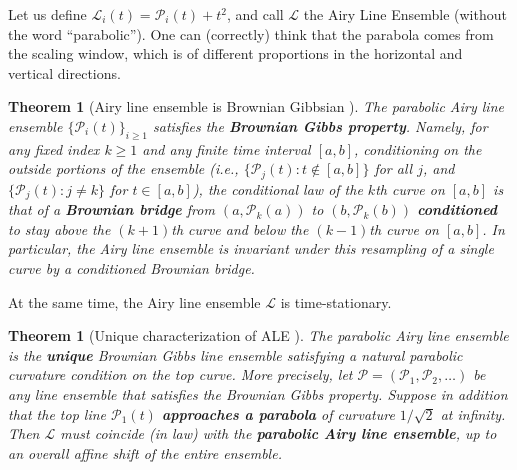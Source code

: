 \documentclass[letterpaper,11pt,oneside,reqno]{book}
\numberwithin{equation}{chapter}  %
\newtheorem{theorem}[proposition]{Theorem}
\theoremstyle{definition}
\begin{document}
Let us define $\mathcal{L}_i(t)=\mathcal{P}_i(t)+t^2$, and call $\mathcal{L}$ the Airy Line Ensemble
(without the word ``parabolic''). One can (correctly) think that the parabola comes
from the scaling window, which is of different proportions in the horizontal and vertical directions.

\begin{theorem}[Airy line ensemble is Brownian Gibbsian \cite{CorwinHammond2013}]
The parabolic Airy line ensemble $\{\mathcal{P}_i(t)\}_{i\ge1}$ satisfies the \textbf{Brownian Gibbs property}. Namely, for any fixed index $k\ge1$ and any finite time interval $[a,b]$, conditioning on the outside portions of the ensemble (i.e., $\{\mathcal{P}_j(t): t\notin[a,b]\}$ for all $j$, and $\{\mathcal{P}_j(t): j\neq k\}$ for $t\in[a,b]$), the conditional law of the $k$th curve on $[a,b]$ is that of a \textbf{Brownian bridge} from $(a,\mathcal{P}_k(a))$ to $(b,\mathcal{P}_k(b))$ \textbf{conditioned} to stay above the $(k+1)$th curve and below the $(k-1)$th curve on $[a,b]$. In particular, the Airy line ensemble is invariant under this resampling of a single curve by a conditioned Brownian bridge.
\end{theorem}

At the same time, the Airy line ensemble $\mathcal{L}$ is time-stationary.

\begin{theorem}[Unique characterization of ALE \cite{AggarwalHuang2023Characterization}]
	The parabolic Airy line ensemble is the \textbf{unique} Brownian Gibbs line ensemble satisfying a natural parabolic curvature condition on the top curve. More precisely, let $\boldsymbol{\mathcal{P}}=(\mathcal{P}_1,\mathcal{P}_2,\ldots)$ be any line ensemble that satisfies the Brownian Gibbs property. Suppose in addition that the top line $\mathcal{P}_1(t)$ \textbf{approaches a parabola} of curvature $1/\sqrt{2}$ at infinity. Then $\boldsymbol{\mathcal{L}}$ must coincide (in law) with the \textbf{parabolic Airy line ensemble}, up to an overall affine shift of the entire ensemble.
\end{theorem}
\end{document}
